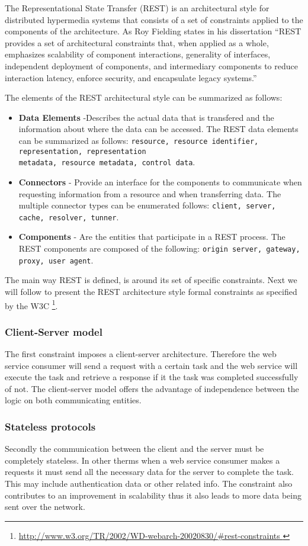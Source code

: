 The Representational State Transfer (REST) is an architectural style for distributed hypermedia systems that  consists of a set of constraints applied to the components of the architecture.
As Roy Fielding states in his dissertation \cite{fielding} ``REST provides a set of architectural constraints that, when applied as a whole, emphasizes scalability of component interactions, generality of interfaces, independent deployment of components, and intermediary components to reduce interaction latency, enforce security, and encapsulate legacy systems.''

The elements of the REST architectural style can be summarized as follows:
\begin{itemize}
	\item \textbf{Data Elements} -Describes the actual data that is transfered and the information about where the data can be accessed. The REST data elements can be summarized as follows: \texttt{resource, resource identifier, representation, representation\\ metadata, resource metadata, control data}.
	\item \textbf{Connectors} - Provide an interface for the components to communicate when requesting information from a  resource and when transferring data. The multiple connector types can be enumerated follows: \texttt{client, server, cache, resolver, tunner}.
	\item \textbf{Components} - Are the entities that participate in a REST process. The REST components are composed of the following: \texttt{origin server, gateway, proxy, user agent}.
\end{itemize}
The main way REST is defined, is around its set of specific constraints. Next we will follow to present the REST architecture style formal constraints as specified by the W3C \footnote{\url{http://www.w3.org/TR/2002/WD-webarch-20020830/\#rest-constraints	}}.
\subsubsection{Client-Server model}
The first constraint imposes a client-server architecture. Therefore the web service consumer will send a request with a certain task and the web service will execute the task and retrieve a response if it the task was completed successfully of not. The client-server model offers the advantage of independence between the logic on both communicating entities.
\subsubsection{Stateless protocols}
Secondly the communication between the client and the server must be completely stateless. In other therms when a web service consumer makes a requests it must send all the necessary data for the server to complete the task. This may include authentication data or other related info. The constraint also contributes to an improvement in scalability thus it also leads to more data being sent over the network. 
